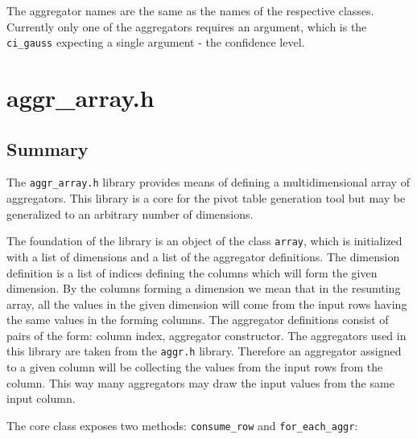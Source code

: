 \documentclass{report}
\begin{document}
	The aggregator names are the same as the names of the respective classes. Currently
	only one of the aggregators requires an argument, which is the \texttt{ci\_gauss}
	expecting a single argument - the confidence level.

\section{aggr\_array.h}

	\subsection{Summary}
	The \texttt{aggr\_array.h} library provides means of defining a multidimensional
	array of aggregators. This library is a core for the pivot table generation tool
	but may be generalized to an arbitrary number of dimensions.

	The foundation of the library is an object of the class \texttt{array}, which is
	initialized with a list of dimensions and a list of the aggregator definitions.
	The dimension definition is a list of indices defining the columns which will
	form the given dimension. By the columns forming a dimension we mean that in the
	resumting array, all the values in the given dimension will come from the input
	rows having the same values in the forming columns. The aggregator definitions
	consist of pairs of the form: column index, aggregator constructor. The
	aggregators used in this library are taken from the \texttt{aggr.h} library.
	Therefore an aggregator assigned to a given column will be collecting the values
	from the input rows from the column. This way many aggregators may draw the input
	values from the same input column.

	The core class exposes two methods: \texttt{consume\_row} and
	\texttt{for\_each\_aggr}:
	
\end{document}
